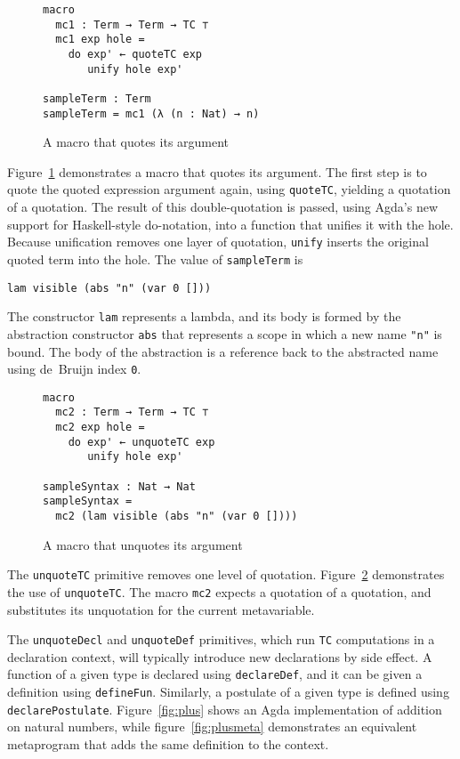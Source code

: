 \documentclass[sigplan,10pt]{acmart}
\begin{document}
\begin{figure}
\begin{Verbatim}
macro
  mc1 : Term → Term → TC ⊤
  mc1 exp hole =
    do exp' ← quoteTC exp
       unify hole exp'

sampleTerm : Term
sampleTerm = mc1 (λ (n : Nat) → n)
\end{Verbatim}
\caption{A macro that quotes its argument}
\label{fig:macro1}
\end{figure}

Figure~\ref{fig:macro1} demonstrates a macro that quotes its argument.
The first step is to quote the quoted expression argument again, using \texttt{quoteTC}, yielding a quotation of a quotation.
The result of this double-quotation is passed, using Agda's new support for Haskell-style do-notation, into a function that unifies it with the hole.
Because unification removes one layer of quotation, \texttt{unify} inserts the original quoted term into the hole.
The value of {\tt sampleTerm} is
\begin{center}
\begin{BVerbatim}
lam visible (abs "n" (var 0 []))
\end{BVerbatim}
\end{center}
The constructor \texttt{lam} represents a lambda, and its body is formed by the abstraction constructor \texttt{abs} that represents a scope in which a new name \texttt{"n"} is bound.
The body of the abstraction is a reference back to the abstracted name using de~Bruijn index \texttt{0}.

\begin{figure}
\centering
\begin{Verbatim}
macro
  mc2 : Term → Term → TC ⊤
  mc2 exp hole =
    do exp' ← unquoteTC exp
       unify hole exp'

sampleSyntax : Nat → Nat
sampleSyntax =
  mc2 (lam visible (abs "n" (var 0 [])))
\end{Verbatim}
\caption{A macro that unquotes its argument}
\label{fig:macro2}
\end{figure}

The {\tt unquoteTC} primitive removes one level of quotation.
Figure~\ref{fig:macro2} demonstrates the use of \texttt{unquoteTC}.
The macro {\tt mc2} expects a quotation of a quotation, and substitutes its unquotation for the current metavariable.

The {\tt unquoteDecl} and {\tt unquoteDef} primitives, which run \texttt{TC} computations in a declaration context, will typically introduce new declarations by side effect.
A function of a given type is declared using {\tt declareDef}, and it can be given a definition using {\tt defineFun}.
Similarly, a postulate of a given type is defined using {\tt declarePostulate}.
Figure~\ref{fig:plus} shows an Agda implementation of addition on natural numbers, while figure~\ref{fig:plusmeta} demonstrates an equivalent metaprogram that adds the same definition to the context.
\end{document}
